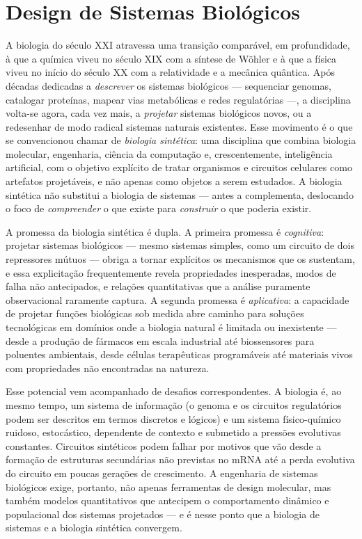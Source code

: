 \chapter{Design de Sistemas Biológicos}
\label{cap:14}

\normalfont\rmfamily\upshape
A biologia do século XXI atravessa uma transição comparável, em profundidade, à que a química viveu no século XIX com a síntese de Wöhler e à que a física viveu no início do século XX com a relatividade e a mecânica quântica. Após décadas dedicadas a \emph{descrever} os sistemas biológicos --- sequenciar genomas, catalogar proteínas, mapear vias metabólicas e redes regulatórias ---, a disciplina volta-se agora, cada vez mais, a \emph{projetar} sistemas biológicos novos, ou a redesenhar de modo radical sistemas naturais existentes. Esse movimento é o que se convencionou chamar de \emph{biologia sintética}: uma disciplina que combina biologia molecular, engenharia, ciência da computação e, crescentemente, inteligência artificial, com o objetivo explícito de tratar organismos e circuitos celulares como artefatos projetáveis, e não apenas como objetos a serem estudados. A biologia sintética não substitui a biologia de sistemas --- antes a complementa, deslocando o foco de \emph{compreender} o que existe para \emph{construir} o que poderia existir.

A promessa da biologia sintética é dupla. A primeira promessa é \emph{cognitiva}: projetar sistemas biológicos --- mesmo sistemas simples, como um circuito de dois repressores mútuos --- obriga a tornar explícitos os mecanismos que os sustentam, e essa explicitação frequentemente revela propriedades inesperadas, modos de falha não antecipados, e relações quantitativas que a análise puramente observacional raramente captura. A segunda promessa é \emph{aplicativa}: a capacidade de projetar funções biológicas sob medida abre caminho para soluções tecnológicas em domínios onde a biologia natural é limitada ou inexistente --- desde a produção de fármacos em escala industrial até biossensores para poluentes ambientais, desde células terapêuticas programáveis até materiais vivos com propriedades não encontradas na natureza.

Esse potencial vem acompanhado de desafios correspondentes. A biologia é, ao mesmo tempo, um sistema de informação (o genoma e os circuitos regulatórios podem ser descritos em termos discretos e lógicos) e um sistema físico-químico ruidoso, estocástico, dependente de contexto e submetido a pressões evolutivas constantes. Circuitos sintéticos podem falhar por motivos que vão desde a formação de estruturas secundárias não previstas no mRNA até a perda evolutiva do circuito em poucas gerações de crescimento. A engenharia de sistemas biológicos exige, portanto, não apenas ferramentas de design molecular, mas também modelos quantitativos que antecipem o comportamento dinâmico e populacional dos sistemas projetados --- e é nesse ponto que a biologia de sistemas e a biologia sintética convergem.

